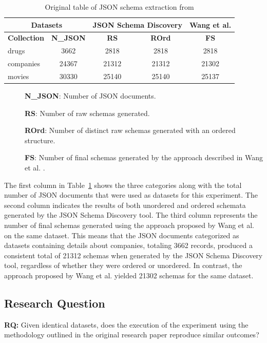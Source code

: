 \documentclass[sigconf, nonacm]{acmart}
\begin{document}
\begin{table}
\centering
\caption{Original table of JSON schema extraction from \cite{frozza2018approach}}\label{dbpedia}
\scalebox{0.80} {
\begin{tabular}{|l|c|c|c|c|}
\hline
\multicolumn{2}{|c|}{\textbf{Datasets}} & \multicolumn{2}{c|}{\textbf{JSON Schema Discovery}} & \textbf{Wang et al.} \cite{wang2015schema}\\
\hline
\textbf{Collection} & \textbf{N\_JSON} & \textbf{RS} & \textbf{ROrd} & \textbf{FS} \\
\hline
drugs & 3662 & 2818 & 2818 & 2818 \\
\hline 
companies & 24367 & 21312 & 21312 & 21302 \\
\hline
movies & 30330 & 25140 & 25140 & 25137 \\
\hline
\end{tabular}
}
\end{table}

\begin{description}
  \item[\textbullet] \textbf{N\_JSON}: Number of JSON documents.
  \item[\textbullet] \textbf{RS}: Number of raw schemas generated.
  \item[\textbullet]\textbf{ROrd}: Number of distinct raw schemas generated with an ordered structure.
  \item[\textbullet]\textbf{FS}: Number of final schemas generated by the approach described in Wang et al. \cite{wang2015schema}.
\end{description}

The first column in Table~\ref{dbpedia} shows the three categories along with the total number of JSON documents that were used as datasets for this experiment. The second column indicates the results of both unordered and ordered schemata generated by the JSON Schema Discovery tool. The third column represents the number of final schemas generated using the approach proposed by Wang et al. \cite{wang2015schema} on the same dataset. This means that the JSON documents categorized as datasets containing details about companies, totaling 3662 records, produced a consistent total of 21312 schemas when generated by the JSON Schema Discovery tool, regardless of whether they were ordered or unordered. In contrast, the approach proposed by Wang et al. \cite{wang2015schema} yielded 21302 schemas for the same dataset.

\subsection{Research Question}\label{subsec:research}
\textbf{RQ:} Given identical datasets, does the execution of the experiment using the methodology outlined in the original research paper reproduce similar outcomes?
\end{document}

